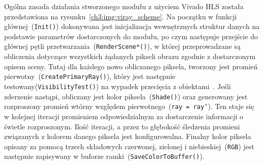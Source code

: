
Ogólna zasada działania stworzonego modułu z użyciem Vivado HLS została przedstawiona na rysunku~\ref{ch3:img:viray_scheme}. Na początku w funkcji głównej~(\texttt{Init()}) dokonywana jest inicjalizacja wewnętrznych struktur danych na podstawie parametrów dostarczonych do modułu, po czym następuje przejście do głównej pętli przetwarzania~(\texttt{RenderScene*()}), w której przeprowadzane są obliczenia dotyczące wszystkich żądanych pikseli obrazu zgodnie z dostarczonym opisem sceny. Tutaj dla każdego nowo obliczanego piksela, tworzony jest promień pierwotny~(\texttt{CreatePrimaryRay()}), który jest następnie testowany(\texttt{VisibilityTest()}) na wypadek przecięcia z obiektami~. Jeśli zderzenie nastąpi, obliczany jest kolor piksela~(\texttt{Shade()}) oraz generowany jest rozproszony promień wtórny względem pierwotnego~(\texttt{ray = ray'}). Ten staje się w kolejnej iteracji promieniem odpowiedzialnym za dostarczenie informacji o świetle rozproszonym. Ilość iteracji, a przez to głębokość śledzenia promieni związanych z kolorem danego piksela jest konfigurowalna. Finalny kolor piksela opisany za pomocą trzech składowych czerwonej, zielonej i niebieskiej~(\texttt{RGB}) jest następnie zapisywany w buforze ramki~(\texttt{SaveColorToBuffer()}).

